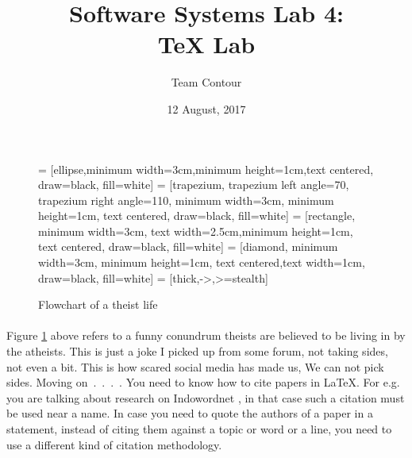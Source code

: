 \documentclass[titlepage,11pt,a4paper]{article}
\begin{document}
\title{\textbf{Software Systems Lab 4:\\TeX Lab}}
\author{Team Contour}
\date{12 August, 2017}
\maketitle

\newpage

\begin{figure} 
\caption{Flowchart of a theist life}
\label{fig:f}
 = [ellipse,minimum width=3cm,minimum height=1cm,text centered, draw=black, fill=white]
 = [trapezium, trapezium left angle=70, trapezium right angle=110, minimum width=3cm, minimum height=1cm, text centered, draw=black, fill=white]
 = [rectangle, minimum width=3cm, text width=2.5cm,minimum height=1cm, text centered, draw=black, fill=white]
 = [diamond, minimum width=3cm, minimum height=1cm, text centered,text width=1cm, draw=black, fill=white]
 = [thick,->,>=stealth]

\begin{center}
\end{center}
\end{figure}

\paragraph{} Figure \ref{fig:f} above refers to a funny conundrum theists are believed to be living in by the atheists. This is just a joke I picked up from some forum, not taking sides, not even a bit. This is how scared social media has made us, We can not pick sides. Moving on\ .\ .\ .\ . You need to know how to cite papers in \LaTeX. For e.g. you are talking about research on Indowordnet \cite{indowordnet}, in that case such a citation must be used near a name. In case you need to quote the authors of a paper in a statement, instead of citing them against a topic or word or a line, you need to use a different kind of citation methodology.
\end{document}
